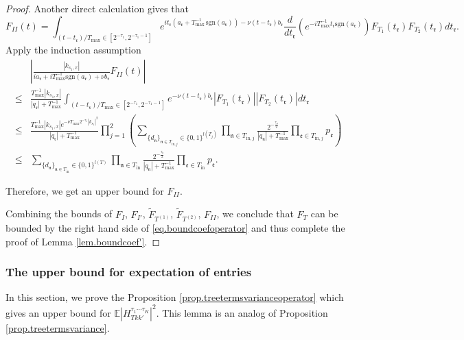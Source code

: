 \begin{proof}
Another direct calculation gives that 
\begin{equation}
    F_{II}(t)=\int_{(t-t_{\mathfrak{r}})/T_{\text{max}}\in [2^{-\tau_{1}},2^{-\tau_{1}-1}]}  e^{it_{\mathfrak{r}}(a_{\mathfrak{r}}+T^{-1}_{\text{max}}\, \text{sgn}(a_{\mathfrak{r}}))- \nu(t-t_{\mathfrak{r}})b_{\mathfrak{r}}} \frac{d}{dt_{\mathfrak{r}}}(e^{-iT^{-1}_{\text{max}}t_{\mathfrak{r}} \text{sgn}(a_{\mathfrak{r}})})  F_{T_1}(t_{\mathfrak{r}})F_{T_2}(t_{\mathfrak{r}}) dt_{\mathfrak{r}}.
\end{equation}
Apply the induction assumption
\begin{equation}
\begin{split}
    &\left| \frac{|k_{s_1,x}|}{ia_{\mathfrak{r}}+iT^{-1}_{\text{max}} \text{sgn}(a_{\mathfrak{r}})+\nu b_{\mathfrak{r}} } F_{II}(t)\right|
    \\
    \le &\frac{T^{-1}_{\text{max}}|k_{s_1,x}|}{|q_{\mathfrak{r}}|+T^{-1}_{\text{max}}}\int_{(t-t_{\mathfrak{r}})/T_{\text{max}}\in [2^{-\tau_{1}},2^{-\tau_{1}-1}]}  e^{- \nu(t-t_{\mathfrak{r}})b_{\mathfrak{r}}}   |F_{T_1}(t_{\mathfrak{r}})| |F_{T_2}(t_{\mathfrak{r}})| dt_{\mathfrak{r}}
    \\
    \le& \frac{T^{-1}_{\text{max}} |k_{s_1,x}| e^{- \nu T_{\text{max}} 2^{-\tau_{1}}|k_{s_1}|^2}}{|q_{\mathfrak{r}}|+T^{-1}_{\text{max}}}\prod_{j=1}^2\left(\sum_{\{d_{\mathfrak{n}}\}_{\mathfrak{n}\in T_{\text{in},j}}\in\{0,1\}^{l(T_j)}}\prod_{\mathfrak{n}\in T_{\text{in},j}}\frac{2^{-\frac{\tau_{\mathfrak{n}}}{2}}}{|q_{\mathfrak{n}}|+T^{-1}_{\text{max}}}\prod_{\mathfrak{e}\in T_{\text{in},j}} p_{\mathfrak{e}}\right)
    \\
    \le& \sum_{\{d_{\mathfrak{n}}\}_{\mathfrak{n}\in T_{\text{in}}}\in\{0,1\}^{l(T)}}\prod_{\mathfrak{n}\in T_{\text{in}}}\frac{2^{-\frac{\tau_{\mathfrak{n}}}{2}}}{|q_{\mathfrak{n}}|+T^{-1}_{\text{max}}}\prod_{\mathfrak{e}\in T_{\text{in}}} p_{\mathfrak{e}}.
\end{split}
\end{equation}

Therefore, we get an upper bound for $F_{II}$.

Combining the bounds of $F_{I}$, $F_{I'}$, $\widetilde{F}_{T^{(1)}}$, $\widetilde{F}_{T^{(2)}}$, $F_{II}$, we conclude that $F_T$ can be bounded by the right hand side of \eqref{eq.boundcoefoperator} and thus complete the proof of Lemma \ref{lem.boundcoef'}.
\end{proof}

\subsubsection{The upper bound for expectation of entries} In this section, we prove the Proposition \ref{prop.treetermsvarianceoperator} which gives an upper bound for $\mathbb{E}|H^{\tau_1\cdots \tau_{K}}_{Tkk'}|^2$. This lemma is an analog of Proposition \ref{prop.treetermsvariance}.

